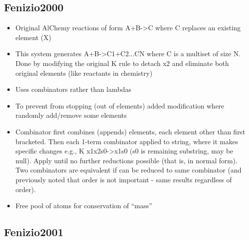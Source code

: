 		\hypertarget{fenizio2000}{\subsection{Fenizio2000}\label{fenizio2000}}
		
		\begin{itemize}
			\item
			
			Original AlChemy reactions of form A+B-\textgreater{}C where C
			replaces an existing element (X)
			
			\item
			
			This system generates A+B-\textgreater{}C1+C2...CN where C is a
			multiset of size N. Done by modifying the original K rule to detach x2
			and eliminate both original elements (like reactants in chemistry)
			
			\item
			
			Uses combinators rather than lambdas
			
			\item
			
			To prevent from stopping (out of elements) added modification where
			randomly add/remove some elements
			
			\item
			
			Combinator first combines (appends) elements, each element other than
			first bracketed. Then each 1-term combinator applied to string, where
			it makes specific changes e.g., K x1x2s0-\textgreater{}x1s0 (s0 is
			remaining substring, may be null). Apply until no further reductions
			possible (that is, in normal form). Two combinators are equivalent if
			can be reduced to same combinator (and previously noted that order is
			not important - same results regardless of order).
			
			\item
			
			Free pool of atoms for conservation of ``mass''
			
		\end{itemize}
		
		\hypertarget{fenizio2001}{\subsection{Fenizio2001}\label{fenizio2001}}
		
